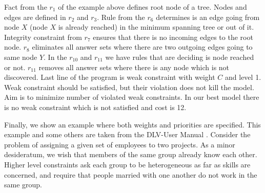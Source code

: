 \documentclass[14pt,a4paper, titlepage]{article}
\begin{document}
Fact from the $r_1$ of the example above defines root node of a tree. Nodes and edges are defined in $r_2$ and $r_3$. Rule from the $r_6$ determines is an edge going from node $X$ (node $X$ is already reached) in the minimum spanning tree or out of it. Integrity constraint from $r_7$ ensures that there is no incoming edges to the root node. $r_8$ eliminates all answer sets where there are two outgoing edges going to same node $Y$. In the $r_{10}$ and $r_{11}$ we have rules that are deciding is node reached or not. $r_{11}$ removes all answer sets where there is any node which is not discovered. Last line of the program is weak constraint with weight $C$ and level 1. Weak constraint should be satisfied, but their violation does not kill the model. Aim is to minimize number of violated weak constraints. In our best model there is no weak constraint which is not satisfied and cost is 12.  


Finally, we show an example where both weights and priorities are specified. This example and some others are taken from the DLV-User Manual \cite{dlvum}. Consider the problem of assigning a given set of employees to two projects. As a minor desideratum, we wish that members of the same group already know each other. Higher level constraints ask each group to be heterogeneous as far as skills are concerned, and require that people married with one another do not work in the same group.
\end{document}
